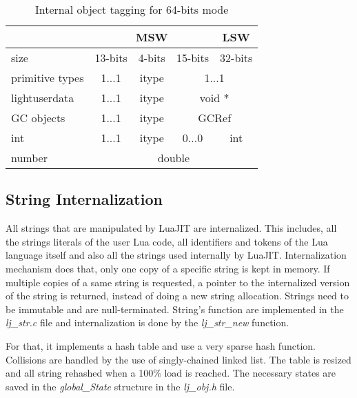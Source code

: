 \begin{table}[H]
\centering
\caption{Internal object tagging for 64-bits mode}
\label{tab:tagged-gc64}
\begin{tabular}{l|c|c|c|c|}
\cline{2-5}
                                      & \multicolumn{3}{c|}{MSW}         & LSW         \\ \hline
\multicolumn{1}{|l|}{size}            & 13-bits & 4-bits & 15-bits       & 32-bits     \\ \hline
\multicolumn{1}{|l|}{primitive types} & 1...1   & itype  & \multicolumn{2}{c|}{1...1}  \\
\multicolumn{1}{|l|}{lightuserdata}   & 1...1   & itype  & \multicolumn{2}{c|}{void *} \\
\multicolumn{1}{|l|}{GC objects}      & 1...1   & itype  & \multicolumn{2}{c|}{GCRef}  \\
\multicolumn{1}{|l|}{int}             & 1...1   & itype  & 0...0         & int         \\
\multicolumn{1}{|l|}{number}          & \multicolumn{4}{c|}{double}                    \\ \hline
\end{tabular}
\end{table}


\subsection{String Internalization}
\label{Subsec:string-inter}

All strings that are manipulated by LuaJIT are internalized. This includes, all
the strings literals of the user Lua code, all identifiers and tokens of the Lua
language itself and also all the strings used internally by LuaJIT. Internalization
mechanism does that, only one copy of a specific string is kept in memory. If
multiple copies of a same string is requested, a pointer to the internalized
version of the string is returned, instead of doing a new string allocation.
Strings need to be immutable and are null-terminated. String's function are
implemented in the \emph{lj\_str.c} file and internalization is done by the
\emph{lj\_str\_new} function.

For that, it implements a hash table and use a very sparse hash
function. Collisions are handled by the use of singly-chained linked list.
The table is resized and all string rehashed when a 100\% load is reached.
The necessary states are saved in the \emph{global\_State} structure in the
\emph{lj\_obj.h} file.

